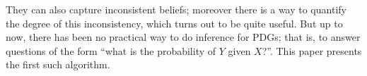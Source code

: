 \documentclass{article}
\newcommand\discard[1]{}
\begin{document}
\discard{%
    They can also capture inconsistent beliefs,
    Moreover, there is a useful way to quantify the degree of this inconsistency:
    the discrepancy between the PDG, and the 
        probability measure that 
        best represents it.
     }%
They can also capture inconsistent beliefs;
moreover there is 
a 
way to quantify the degree of this inconsistency,
which turns out to be quite useful.
But up to now,
there has been no practical way to do 
inference 
for
PDGs; that is,
to answer questions of the form ``what is the probability of $Y$ given $X$?''.
This paper presents the first such algorithm.
\end{document}
